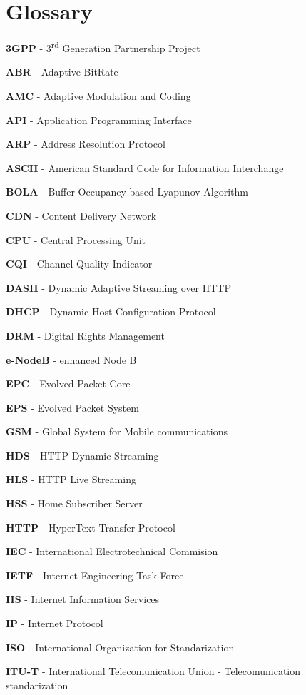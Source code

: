 \cleardoublepage
{}
\chapter*{Glossary}


\textbf{3GPP} - 3\textsuperscript{rd} Generation Partnership Project

\textbf{ABR} - Adaptive BitRate

\textbf{AMC} - Adaptive Modulation and Coding

\textbf{API} - Application Programming Interface

\textbf{ARP} - Address Resolution Protocol

\textbf{ASCII} - American Standard Code for Information Interchange

\textbf{BOLA} - Buffer Occupancy based Lyapunov Algorithm

\textbf{CDN} - Content Delivery Network

\textbf{CPU} - Central Processing Unit

\textbf{CQI} - Channel Quality Indicator

\textbf{DASH} - Dynamic Adaptive Streaming over HTTP

\textbf{DHCP} - Dynamic Host Configuration Protocol

\textbf{DRM} - Digital Rights Management

\textbf{e-NodeB} - enhanced Node B

\textbf{EPC} - Evolved Packet Core

\textbf{EPS} - Evolved Packet System

\textbf{GSM} - Global System for Mobile communications

\textbf{HDS} - HTTP Dynamic Streaming

\textbf{HLS} - HTTP Live Streaming

\textbf{HSS} - Home Subscriber Server

\textbf{HTTP} - HyperText Transfer Protocol

\textbf{IEC} - International Electrotechnical Commision

\textbf{IETF} - Internet Engineering Task Force

\textbf{IIS} - Internet Information Services

\textbf{IP} - Internet Protocol

\textbf{ISO} - International Organization for Standarization

\textbf{ITU-T} - International Telecomunication Union - Telecomunication standarization

